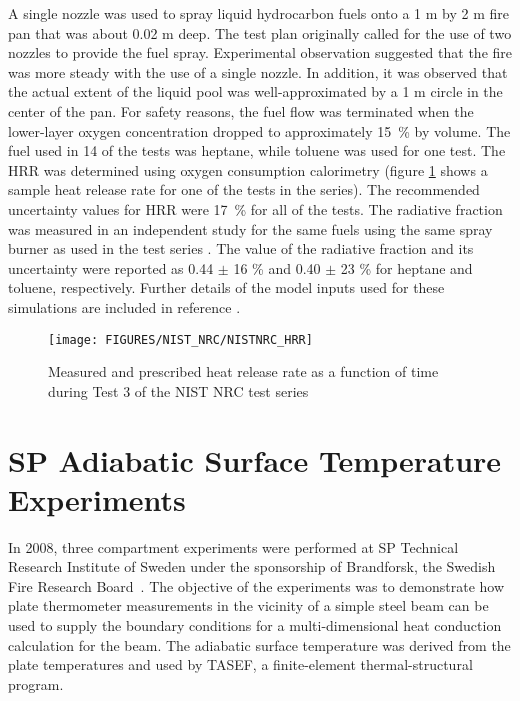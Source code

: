 A single nozzle was used to spray liquid hydrocarbon fuels onto a 1 m by 2 m fire pan that was about 0.02 m deep. The test plan originally called for the use of two nozzles to provide the fuel spray. Experimental observation suggested that the fire was more steady with the use of a single nozzle. In addition, it was observed that the actual extent of the liquid pool was well-approximated by a 1 m circle in the center of the pan. For safety reasons, the fuel flow was terminated when the lower-layer oxygen concentration dropped to approximately 15~\% by volume. The fuel used in 14 of the tests was heptane, while toluene was used for one test. The HRR was determined using oxygen consumption calorimetry (figure \ref{fig:NISTNRC_HRR} shows a sample heat release rate for one of the tests in the series). The recommended uncertainty values for HRR were 17~\% for all of the tests. The radiative fraction was measured in an independent study for the same fuels using the same spray burner as used in the test series \cite{Hamins:2003}. The value of the radiative fraction and its uncertainty were reported as 0.44 $\pm$ 16 \% and 0.40 $\pm$ 23 \% for heptane and toluene, respectively. Further details of the model inputs used for these simulations are included in reference \cite{NRCNUREG1824}.

\begin{figure}[\figoptions{t}]
\begin{center}
\texttt{[image: FIGURES/NIST\_NRC/NISTNRC\_HRR]}\\
\end{center}
\caption{Measured and prescribed heat release rate as a function of time during Test 3 of the NIST NRC test series}
 \label{fig:NISTNRC_HRR}
\end{figure}

\section{SP Adiabatic Surface Temperature Experiments}

In 2008, three compartment experiments were performed at SP Technical Research Institute of Sweden under the sponsorship of Brandforsk, the Swedish Fire Research Board~\cite{Wickstrom_AST}. The objective of the experiments was to demonstrate how plate thermometer measurements in the vicinity of a simple steel beam can be used to supply the boundary conditions for a multi-dimensional heat conduction calculation for the beam. The adiabatic surface temperature was derived from the plate temperatures and used by TASEF, a finite-element
thermal-structural program.

